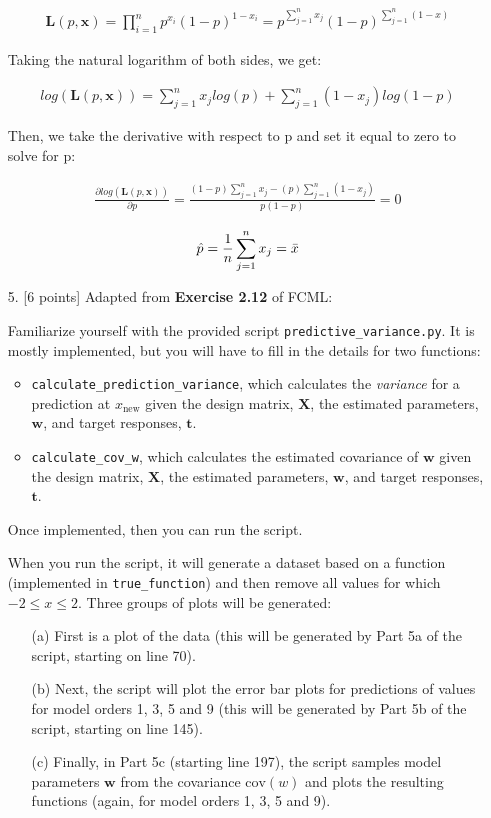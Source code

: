 \documentclass[10pt]{article}
\begin{document}
\begin{itemize}
\begin{align*}
    \mathbf{L}(p, \mathbf{x}) =
    \prod_{i=1}^{n} p^{x_i}(1-p)^{1-x_i} =
    p^{\sum_{j=1}^n x_j}(1-p)^{\sum_{j=1}^n (1-x)}
\end{align*}

Taking the natural logarithm of both sides, we get:

\begin{align*}
    log(\mathbf{L}(p, \mathbf{x})) = 
    \sum_{j=1}^n x_j log(p) + \sum_{j=1}^n (1-x_j) log(1-p)
\end{align*}

Then, we take the derivative with respect to p and set it equal to zero to solve for p:

\begin{align*}
    \frac{\partial log(\mathbf{L}(p, \mathbf{x}))}{\partial p} = 
    \frac{(1-p)\sum_{j=1}^n x_j - (p)\sum_{j=1}^n (1-x_j)}{p(1-p)} = 0
\end{align*}

\begin{align*}
    \hat{p} =
    \frac{1}{n} \sum_{j=1}^n x_j = \Bar{x}
\end{align*}


\item[5.] [6 points]
Adapted from {\bf Exercise 2.12} of FCML:

Familiarize yourself with the provided script {\tt predictive\_variance.py}.  
It is mostly implemented, but you will have to fill in the details for two functions: 
\begin{itemize}
\item {\tt calculate\_prediction\_variance}, which calculates the {\em variance} for a prediction at $x_{\mathrm{new}}$ given the design matrix, $\mathbf{X}$, the estimated parameters, $\mathbf{w}$, and target responses, $\mathbf{t}$.
\item {\tt calculate\_cov\_w}, which calculates the estimated covariance of $\mathbf{w}$ given the design matrix, $\mathbf{X}$, the estimated parameters, $\mathbf{w}$, and target responses, $\mathbf{t}$.
\end{itemize}
Once implemented, then you can run the script.

When you run the script, it will generate a dataset based on a function (implemented in {\tt true\_function}) and then remove all values for which $-2 \leq x \leq 2$.  Three groups of plots will be generated:
\begin{enumerate}
\item[(a)] First is a plot of the data (this will be generated by Part 5a of the script, starting on line 70).  
\item[(b)] Next, the script will plot the error bar plots for predictions of values for model orders 1, 3, 5 and 9 (this will be generated by Part 5b of the script, starting on line 145).  
\item[(c)] Finally, in Part 5c (starting line 197), the script samples model parameters $\mathbf{w}$ from the covariance $\mathrm{cov}(w)$ and plots the resulting functions (again, for model orders 1, 3, 5 and 9).
\end{enumerate}


\end{itemize}
\end{document}
